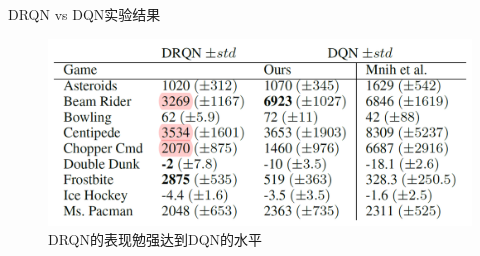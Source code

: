 \documentclass[10pt]{beamer}
\begin{document}
	\begin{frame}{DRQN vs DQN}{实验结果}
		\begin{figure}
			\centering
			\includegraphics[width=0.9\linewidth]{pictures/dqn-vs-drqn-result}
			\caption{DRQN的表现勉强达到DQN的水平}
			\label{fig:dqn-vs-drqn-result}
		\end{figure}
		
	\end{frame}
\end{document}
